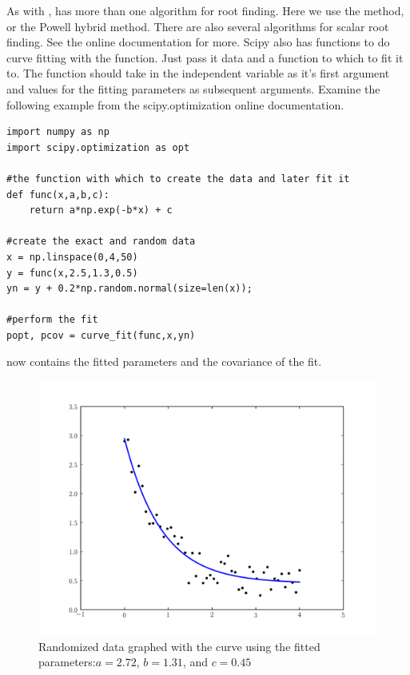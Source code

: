 As with ,  has more than one algorithm for root finding. Here we use the  method, or the Powell hybrid method. There are also several algorithms for scalar root finding. See the online documentation for more.
Scipy also has functions to do curve fitting with the  function. Just pass it data and a function to which to fit it to. The function should take in the independent variable as it's first argument and values for the fitting parameters as subsequent arguments.
Examine the following example from the scipy.optimization online documentation.
\begin{lstlisting}
import numpy as np
import scipy.optimization as opt

#the function with which to create the data and later fit it
def func(x,a,b,c):
    return a*np.exp(-b*x) + c

#create the exact and random data
x = np.linspace(0,4,50)
y = func(x,2.5,1.3,0.5)
yn = y + 0.2*np.random.normal(size=len(x));

#perform the fit
popt, pcov = curve_fit(func,x,yn)
\end{lstlisting}
 now contains the fitted parameters and  the covariance of the fit.
\begin{figure}
\includegraphics[width=\textwidth]{curve_fit.pdf}
\caption{Randomized data graphed with the curve using the fitted parameters:$a=2.72$,  $b=1.31$, and $c=0.45$ }
\label{opt:curve_fit}
\end{figure}
